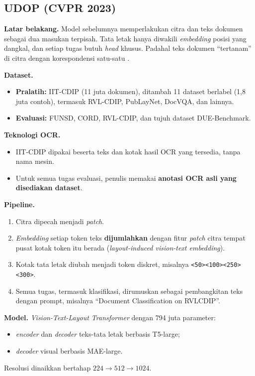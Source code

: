 \subsection{UDOP (CVPR 2023)}\label{sec:udop}

\textbf{Latar belakang.} Model sebelumnya memperlakukan citra dan teks dokumen sebagai dua
masukan terpisah. Tata letak hanya diwakili \textit{embedding} posisi yang dangkal, dan
setiap tugas butuh \textit{head} khusus. Padahal teks dokumen \enquote{tertanam} di citra
dengan korespondensi satu-satu \parencite{tang2023udop}.

\textbf{Dataset.}
\begin{itemize}
  \item \textbf{Pralatih:} IIT-CDIP (11 juta dokumen), ditambah 11 dataset berlabel
  (1,8 juta contoh), termasuk RVL-CDIP, PubLayNet, DocVQA, dan lainnya.
  \item \textbf{Evaluasi:} FUNSD, CORD, RVL-CDIP, dan tujuh dataset DUE-Benchmark.
\end{itemize}

\textbf{Teknologi OCR.}
\begin{itemize}
  \item IIT-CDIP dipakai beserta teks dan kotak hasil OCR yang tersedia, tanpa nama mesin.
  \item Untuk semua tugas evaluasi, penulis memakai \textbf{anotasi OCR asli yang disediakan
  dataset}.
\end{itemize}

\textbf{Pipeline.}
\begin{enumerate}
  \item Citra dipecah menjadi \textit{patch}.
  \item \textit{Embedding} setiap token teks \textbf{dijumlahkan} dengan fitur
  \textit{patch} citra tempat pusat kotak token itu berada (\textit{layout-induced
  vision-text embedding}).
  \item Kotak tata letak diubah menjadi token diskret, misalnya
  \texttt{<50><100><250><300>}.
  \item Semua tugas, termasuk klasifikasi, dirumuskan sebagai pembangkitan teks dengan
  prompt, misalnya \enquote{Document Classification on RVLCDIP}.
\end{enumerate}

\textbf{Model.} \textit{Vision-Text-Layout Transformer} dengan 794 juta parameter:
\begin{itemize}
  \item \textit{encoder} dan \textit{decoder} teks-tata letak berbasis T5-large;
  \item \textit{decoder} visual berbasis MAE-large.
\end{itemize}
Resolusi dinaikkan bertahap $224 \rightarrow 512 \rightarrow 1024$.

